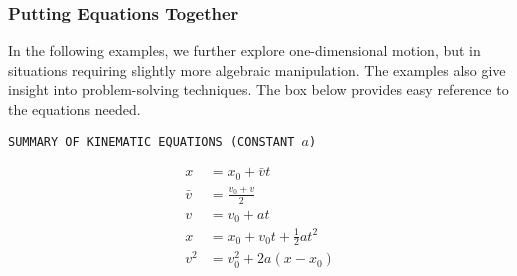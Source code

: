 \documentclass[dvipsnames]{article}
\begin{document}
\subsubsection*{Putting Equations Together}

In the following examples, we further explore one-dimensional motion, but in situations requiring slightly more algebraic manipulation. The examples also give insight into problem-solving techniques. The box below provides easy reference to the equations needed.

\vspace{1em}

\cyanhrule

\begin{center}
    \texttt{SUMMARY OF KINEMATIC EQUATIONS (CONSTANT $a$)}
\end{center}

\vspace{-2em}

\begin{align}
    x &= x_0 + \bar{v} t \\[1ex]
    \bar{v} &= \frac{v_0 + v}{2} \\[1ex]
    v &= v_0 + at \\[1ex]
    x &= x_0 + v_0t + \frac{1}{2} a t^2 \\[1ex]
    v^2 &= v_0^2 + 2a (x - x_0)
\end{align}

\cyanhrule
\end{document}

